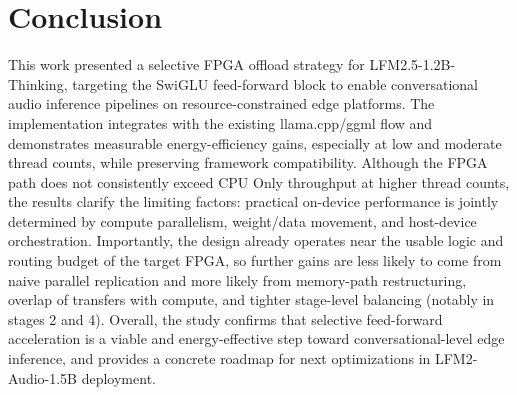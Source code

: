 \documentclass[conference]{IEEEtran}
\begin{document}
\section{Conclusion} \label{sec:conclusion}
This work presented a selective FPGA offload strategy for LFM2.5-1.2B-Thinking, targeting the SwiGLU feed-forward block to enable conversational audio inference pipelines on resource-constrained edge platforms. The implementation integrates with the existing llama.cpp/ggml flow and demonstrates measurable energy-efficiency gains, especially at low and moderate thread counts, while preserving framework compatibility. Although the FPGA path does not consistently exceed CPU Only throughput at higher thread counts, the results clarify the limiting factors: practical on-device performance is jointly determined by compute parallelism, weight/data movement, and host-device orchestration. Importantly, the design already operates near the usable logic and routing budget of the target FPGA, so further gains are less likely to come from naive parallel replication and more likely from memory-path restructuring, overlap of transfers with compute, and tighter stage-level balancing (notably in stages 2 and 4). Overall, the study confirms that selective feed-forward acceleration is a viable and energy-effective step toward conversational-level edge inference, and provides a concrete roadmap for next optimizations in LFM2-Audio-1.5B deployment.


\end{document}

